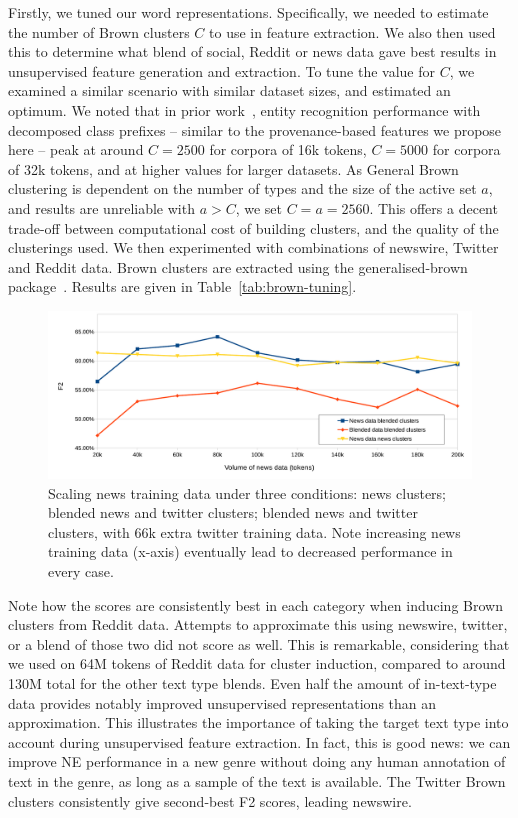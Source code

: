 \documentclass[10pt,journal,compsoc]{IEEEtran}
\begin{document}
Firstly, we tuned our word representations.
Specifically, we needed to estimate the number of Brown clusters $C$ to use in feature extraction.
We also then used this to determine what blend of social, Reddit or news data gave best results in unsupervised feature generation and extraction.
To tune the value for $C$, we examined a similar scenario with similar dataset sizes, and estimated an optimum.
We noted that in prior work~\cite{derczynski2015tune}, entity recognition performance with decomposed class prefixes -- similar to the provenance-based features we propose here -- peak at around $C=2500$ for corpora of 16k tokens, $C=5000$ for corpora of 32k tokens, and at higher values for larger datasets.
As General Brown clustering is dependent on the number of types and the size of the active set $a$, and results are unreliable with $a>C$, we set $C = a = 2560$.
This offers a decent trade-off between computational cost of building clusters, and the quality of the clusterings used.
We then experimented with combinations of newswire, Twitter and Reddit data.
Brown clusters are extracted using the generalised-brown package~\cite{sean_chester_2015_33758}.
Results are given in Table~\ref{tab:brown-tuning}.


\begin{figure}
\centering
\includegraphics[width=\columnwidth]{entity-chunking/chart-results-rcv-crop.pdf}
\caption{Scaling news training data under three conditions: news clusters; blended news and twitter clusters; blended news and twitter clusters, with 66k extra twitter training data. Note increasing news training data (x-axis) eventually lead to decreased performance in every case.}
\label{fig:rcv-scaling}
\end{figure}

Note how the scores are consistently best in each category when inducing Brown clusters from Reddit data.
Attempts to approximate this using newswire, twitter, or a blend of those two did not score as well.
This is remarkable, considering that we used on 64M tokens of Reddit data for cluster induction, compared to around 130M total for the other text type blends.
Even half the amount of in-text-type data provides notably improved unsupervised representations than an approximation.
This illustrates the importance of taking the target text type into account during unsupervised feature extraction.
In fact, this is good news: we can improve NE performance in a new genre without doing any human annotation of text in the genre, as long as a sample of the text is available.
The Twitter Brown clusters consistently give second-best F2 scores, leading newswire.
\end{document}
